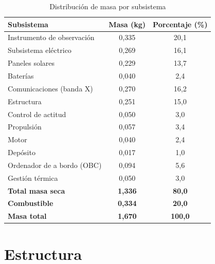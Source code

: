 \begin{table}[h]
  \centering
  \caption{Distribución de masa por subsistema}
  \begin{tabular}{@{}l S[table-format=1.3] S[table-format=2.1]@{}}
    \toprule
    Subsistema                               & {Masa (kg)} & {Porcentaje (\%)} \\
    \midrule
    Instrumento de observación               & 0,335    & 20,1        \\
    Subsistema eléctrico                     & 0,269    & 16,1           \\
    \midrule
    \quad Paneles solares                    & 0,229    & 13,7         \\
    \quad Baterías                           & 0,040    & 2,4          \\
    \midrule
    Comunicaciones (banda X)                 & 0,270    & 16,2          \\
    Estructura                               & 0,251    & 15,0          \\
    Control de actitud                       & 0,050    & 3,0           \\
    Propulsión                               & 0,057    & 3,4          \\
    \midrule
    \quad Motor                          & 0,040    & 2,4         \\
    \quad Depósito                           & 0,017    & 1,0           \\
    \midrule
    Ordenador de a bordo (OBC)               & 0,094    & 5,6          \\
    Gestión térmica                          & 0,050    & 3,0          \\
    \midrule
    \textbf{Total masa seca}                 & \textbf{1,336} & \textbf{80,0}  \\
    \textbf{Combustible}                     & \textbf{0,334} & \textbf{20,0}  \\
    \textbf{Masa total}                      & \textbf{1,670}  & \textbf{100,0} \\
    \bottomrule
  \end{tabular}
\end{table}




\section{Estructura}

